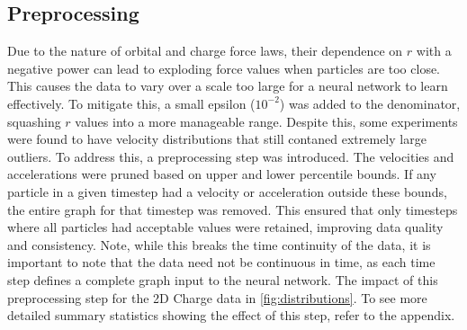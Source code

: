\documentclass[11pt]{article}
\begin{document}
\subsection{Preprocessing}
Due to the nature of orbital and charge force laws, their dependence on \(r\) with a negative power can lead to exploding force values when particles are too close. This causes the data to vary over a scale too large for a neural network to learn effectively. To mitigate this, a small epsilon (\(10^{-2}\)) was added to the denominator, squashing \(r\) values into a more manageable range. Despite this, some experiments were found to have velocity distributions that still contaned extremely large outliers. To address this, a preprocessing step was introduced. The velocities and accelerations were pruned based on upper and lower percentile bounds. If any particle in a given timestep had a velocity or acceleration outside these bounds, the entire graph for that timestep was removed. This ensured that only timesteps where all particles had acceptable values were retained, improving data quality and consistency. Note, while this breaks the time continuity of the data, it is important to note that the data need not be continuous in time, as each time step defines a complete graph input to the neural network. The impact of this preprocessing step for the 2D Charge data in \ref{fig:distributions}. To see more detailed summary statistics showing the effect of this step, refer to the appendix.
\end{document}
